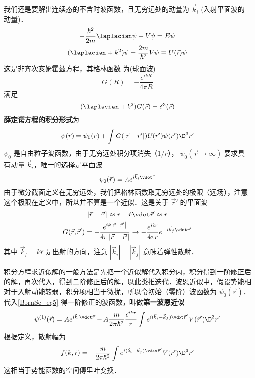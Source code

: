 
我们还是要解出连续态的不含时波函数，且无穷远处的动量为 $\vec k_i$ (入射平面波的动量)．
\begin{gather}
- \frac{{{\hbar ^2}}}{{2m}}{\laplacian}\psi  + V\psi  = E\psi \\
({\laplacian} + {k^2})\psi  = \frac{{2m}}{{{\hbar ^2}}}V\psi  \equiv U(\vec r)\psi
\end{gather}
这是非齐次亥姆霍兹方程，其格林函数%
为(球面波)
\begin{equation}
G(R) =  - \frac{{{e^{ikR}}}}{{4\pi R}}
\end{equation}
满足
\begin{equation}
({\laplacian} + {k^2})G(\vec r) = {\delta ^3}(\vec r)
\end{equation}
\textbf{薛定谔方程的积分形式}为
\begin{equation}\label{BornSc_eq5}
\psi (\vec r) = {\psi _0}(\vec r) + \int {G(\left| {\vec r - \vec r'} \right|)U(\vec r')\psi (\vec r'){\D ^3}r'} 
\end{equation}
$\psi_0$ 是自由粒子波函数，由于无穷远处积分项消失（$1/r$）， $\psi_0(\vec r\to\infty)$ 要求具有动量 $\vec k_i$，唯一的选择是平面波
 \begin{equation}
{\psi _0}(\vec r) = A{e^{i{{\vec k}_i} \vdot \vec r}}
\end{equation}
由于微分截面定义在无穷远处，我们把格林函数取无穷远处的极限（远场），注意这个极限在定义中，所以并不算是一个近似．这是关于 $\vec r'$ 的平面波
\begin{gather}
\left| {\vec r - \vec r'} \right| \approx r - \hat r \vdot \vec r' \approx r\\
G(\vec r,\vec r') =  - \frac{{{e^{ik\left| {\vec r - \vec r'} \right|}}}}{{4\pi \left| {\vec r - \vec r'} \right|}} \to  - \frac{{{e^{ikr}}}}{{4\pi r}}{e^{ - i{{\vec k}_f} \vdot \vec r'}}
\end{gather}
其中 ${\vec k_f} = k\hat r$ 是出射的方向，注意 $\left| {{{\vec k}_i}} \right| = \left| {{{\vec k}_f}} \right|$ 意味着弹性散射．

积分方程求近似解的一般方法是先把一个近似解代入积分内，积分得到一阶修正后的解，再次代入，得到二阶修正后的解，以此类推迭代．波恩近似中，假设势能相对于入射动能较弱，积分项相当于微扰，所以令初始（零阶）波函数为 $\psi_0(\vec r)$．代入\autoref{BornSc_eq5} 得一阶修正的波函数，叫做\textbf{第一波恩近似}
\begin{equation}
{\psi ^{(1)}}(\vec r) = A{e^{i{{\vec k}_i} \vdot \vec r}} - A\frac{m}{{2\pi {\hbar ^2}}}\frac{{{e^{ikr}}}}{r}\int {{e^{i({{\vec k}_i} - {{\vec k}_f}) \vdot \vec r'}}V(\vec r'){\D ^3}r'} 
\end{equation}
根据定义，散射幅为
\begin{equation}
f(k,\hat r) =  - \frac{m}{{2\pi {\hbar ^2}}}\int {{e^{i({{\vec k}_i} - {{\vec k}_f}) \vdot \vec r'}}V(\vec r'){\D ^3}r'}
\end{equation}
这相当于势能函数的空间傅里叶变换．


